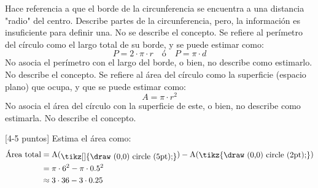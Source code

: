 \documentclass{cdplf-pauta}
\begin{document}
\raggedright
\begin{multicols}{3}

\pregunta
\destacado
[3 puntos] Hace referencia a que el borde de la circunferencia se encuentra 
a una distancia "radio" del centro.
\competente
[1-2 puntos] Describe partes de la circunferencia, pero, la información es 
insuficiente para definir una.
\insuficiente
[0 puntos] No se describe el concepto.
\pregunta
\destacado
[3 puntos] Se refiere al perímetro del círculo como el largo total de su borde, y
se puede estimar como: 
\begin{equation*}
    P = 2\cdot\pi\cdot r \quad \textrm{ó} \quad P = \pi\cdot d
\end{equation*}
\competente
[1-2 puntos] No asocia el perímetro con el largo del borde, o bien, no describe 
como estimarlo. 
\insuficiente
[0 puntos] No describe el concepto.
\pregunta
\destacado
[3 puntos] Se refiere al área del círculo como la superficie (espacio plano) que ocupa, y que 
se puede estimar como: 
\begin{equation*}
    A = \pi \cdot r^2
\end{equation*}
\competente
[1-2 puntos] No asocia el área del círculo con la superficie de este, o bien, no describe como 
estimarla.
\insuficiente
[0 puntos] No describe el concepto.
\pregunta
\destacado
\begin{center}
\end{center}
[4-5 puntos] Estima el área como:
\setlength{\belowdisplayskip}{0pt}
\setlength{\belowdisplayshortskip}{0pt}
\begin{align*}
    \textrm{Área total} &= \mathrm{A}(\raisebox{-2.5pt}{\tikz[]{\draw (0,0) circle (5pt);}}) - \mathrm{A}(\raisebox{-0.5pt}{\tikz{\draw (0,0) circle (2pt);}}) \\
                        &= \pi\cdot 6^2 - \pi\cdot 0.5^2 \\
                        &\approx 3\cdot 36 - 3\cdot 0.25 \\

\end{align*}
\end{multicols}
\end{document}
